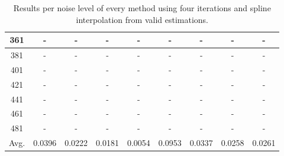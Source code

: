 \begin{table}[ht!]
\begin{tabular}{c|c|c|c|c|c|c|c|c}
361 & - & - & - & - & - & - & - & - \\ \hline
381 & - & - & - & - & - & - & - & - \\ \hline
401 & - & - & - & - & - & - & - & - \\ \hline
421 & - & - & - & - & - & - & - & - \\ \hline
441 & - & - & - & - & - & - & - & - \\ \hline
461 & - & - & - & - & - & - & - & - \\ \hline
481 & - & - & - & - & - & - & - & - \\ \hline
Avg.  & 0.0396 & 0.0222 & 0.0181 & 0.0054 & 0.0953 & 0.0337 & 0.0258 & 0.0261 \\ \hline
\end{tabular}
\caption{Results per noise level of every method using four iterations and spline interpolation from valid estimations.}
\label{tab:4itSperNoiseValid}
\end{table}


